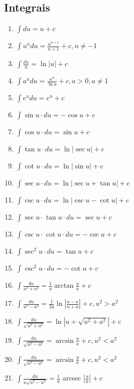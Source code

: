 \documentclass{article}
\begin{document}
\begin{multicols}{2}
    \section{Integrais}

      \begin{enumerate}
        \item \( \int du = u+c \)
        \item \( \int u^n du = \frac{u^{n+1}}{n+1} + c, n \neq -1 \)
        \item \( \int \frac{du}{u} = \ln{|u|} + c \)
        \item \( \int a^u du = \frac{a^u}{\ln{a}} +c, a > 0, a \neq 1 \)
        \item \( \int e^u du = e^u + c \)
        \item \( \int \sin{u} \cdot du = -\cos{u} + c \)
        \item \( \int \cos{u} \cdot du = \sin{u} +c \)
        \item \( \int \tan{u} \cdot du = \ln{|\sec{u}|} + c \)
        \item \( \int \cot{u} \cdot du = \ln{|\sin{u}|} + c \)
        \item \( \int \sec{u} \cdot du  = \ln{|\sec{u} + \tan{u}|} + c \)
        \item \( \int \csc{u} \cdot du  = \ln{|\csc{u} - \cot{u}|} + c \)
        \item \( \int \sec{u} \cdot \tan{u} \cdot du  = \sec{u} + c \)
        \item \( \int \csc{u}\cdot \cot{u} \cdot du = -\csc{u} + c \)
        \item \( \int \sec^2u \cdot du = \tan{u} + c \)
        \item \( \int \csc^2{u} \cdot du = -\cot{u} + c \)
        \item \( \int \frac{du}{u^2+a^2} = \frac{1}{a} \arctan{\frac{u}{a}} + c \)
        \item \( \int \frac{du}{u^2-a^2} = \frac{1}{2a} \ln{|\frac{u-a}{u+a}|} + c, u^2 > a^2 \)
        \item \( \int \frac{du}{\sqrt{u^2+a^2}} = \ln{|u + \sqrt{u^2+a^2}|} + c \)
        \item \( \int \frac{du}{\sqrt{u^2-a^2}} = \arcsin{\frac{u}{a}} + c, u^2 < a^2 \)
        \item \( \int \frac{du}{\sqrt{a^2-u^2}} = \arcsin{\frac{u}{a}} + c, u^2 < a^2 \)
        \item \( \int \frac{du}{u \sqrt{a^2-u^2}} = \frac{1}{a} \) arcsec \( |\frac{u}{a}| + c  \)
      \end{enumerate}

  \end{multicols}
\end{document}
